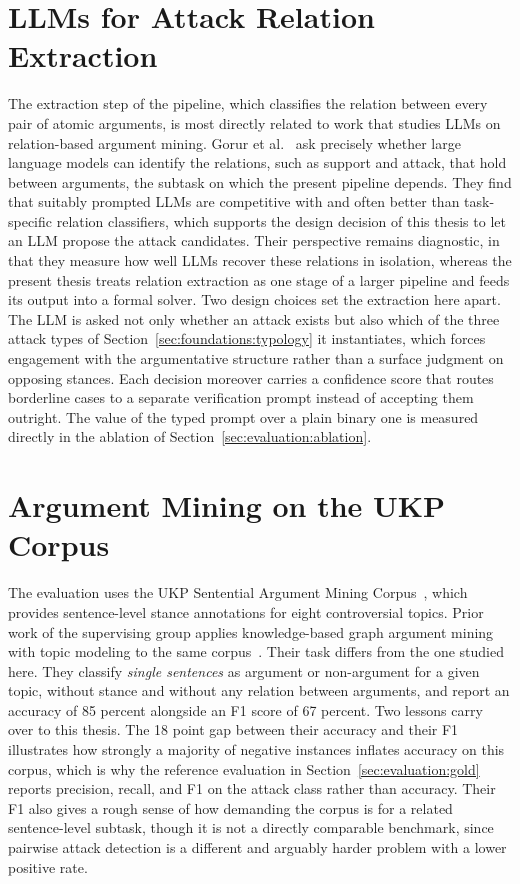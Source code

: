 \section{LLMs for Attack Relation Extraction}
\label{sec:related:extraction}

The extraction step of the pipeline, which classifies the relation between every
pair of atomic arguments, is most directly related to work that studies LLMs on
relation-based argument mining. Gorur et al.~\cite{gorur2025relMining} ask
precisely whether large language models can identify the relations, such as
support and attack, that hold between arguments, the subtask on which the present
pipeline depends. They find that suitably prompted LLMs are competitive with and
often better than task-specific relation classifiers, which supports the design
decision of this thesis to let an LLM propose the attack candidates. Their
perspective remains diagnostic, in that they measure how well
LLMs recover these relations in isolation, whereas the present thesis treats
relation extraction as one stage of a larger pipeline and feeds its output into a
formal solver. Two design choices set the extraction here apart. The LLM is asked not only
whether an attack exists but also which of the three attack types of
Section~\ref{sec:foundations:typology} it instantiates, which forces engagement
with the argumentative structure rather than a surface judgment on opposing
stances. Each decision moreover carries a confidence score that routes
borderline cases to a separate verification prompt instead of accepting them
outright. The value of
the typed prompt over a plain binary one is measured directly in the ablation of
Section~\ref{sec:evaluation:ablation}.

\section{Argument Mining on the UKP Corpus}
\label{sec:related:ukp}

The evaluation uses the UKP Sentential Argument Mining
Corpus~\cite{stab2018}, which provides sentence-level stance annotations for
eight controversial topics. Prior work of the supervising group applies
knowledge-based graph argument mining with topic modeling to the same
corpus~\cite{abels2021}. Their task differs from the one studied here. They
classify \emph{single sentences} as argument or non-argument for a given topic,
without stance and without any relation between arguments, and report an
accuracy of 85 percent alongside an F1 score of 67 percent. Two lessons carry
over to this thesis. The 18 point gap between their accuracy and their F1
illustrates how strongly a majority of negative instances inflates accuracy
on this corpus, which is why the reference evaluation in
Section~\ref{sec:evaluation:gold} reports precision, recall, and F1 on the
attack class rather than accuracy. Their F1 also gives a rough sense of how
demanding the corpus is for a related sentence-level subtask, though it is not
a directly comparable benchmark, since pairwise attack detection is a different
and arguably harder problem with a lower positive rate.

